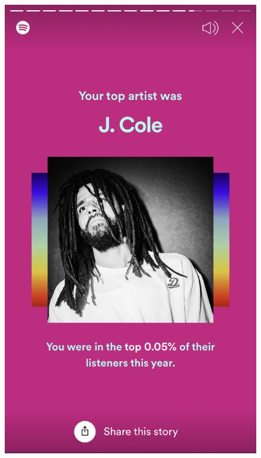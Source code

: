 \documentclass{report}
\begin{document}
\begin{figure}
\begin{minipage}[b]{0.25\textwidth}
    \includegraphics[width=\textwidth]{Imagens/IMG_3831.PNG}
  \end{minipage}
  \hfill
  \begin{minipage}[b]{0.25\textwidth}

\end{minipage}
\end{figure}
\end{document}
